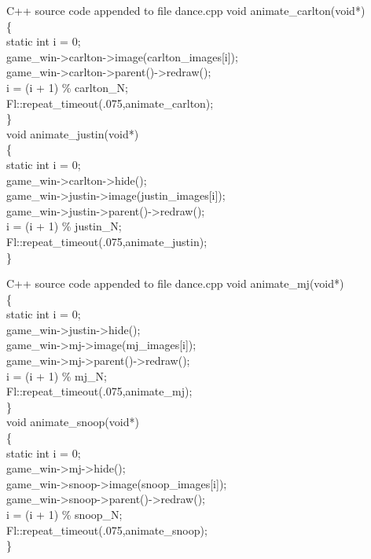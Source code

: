 \documentclass {article}
\begin{document}
\begin{GFT}{C++ source code appended to file dance.cpp}
\+void animate\_carlton(void*)\\
\+\{\\
\+     static int i = 0;\\
\+     game\_win->carlton->image(carlton\_images[i]);\\
\+     game\_win->carlton->parent()->redraw();\\
\+     i = (i + 1) \% carlton\_N;\\
\+     Fl::repeat\_timeout(.075,animate\_carlton);\\
\+\}\\
\+void animate\_justin(void*)\\
\+\{\\
\+     static int i = 0;\\
\+     game\_win->carlton->hide();\\
\+     game\_win->justin->image(justin\_images[i]);\\
\+     game\_win->justin->parent()->redraw();\\
\+     i = (i + 1) \% justin\_N;\\
\+     Fl::repeat\_timeout(.075,animate\_justin);\\
\+\}\\
\end{GFT}
\clearpage
\begin{GFT}{C++ source code appended to file dance.cpp}
\+void animate\_mj(void*)\\
\+\{\\
\+     static int i = 0;\\
\+     game\_win->justin->hide();\\
\+     game\_win->mj->image(mj\_images[i]);\\
\+     game\_win->mj->parent()->redraw();\\
\+     i = (i + 1) \% mj\_N;\\
\+     Fl::repeat\_timeout(.075,animate\_mj);\\
\+\}\\
\+void animate\_snoop(void*)\\
\+\{\\
\+     static int i = 0;\\
\+     game\_win->mj->hide();\\
\+     game\_win->snoop->image(snoop\_images[i]);\\
\+     game\_win->snoop->parent()->redraw();\\
\+     i = (i + 1) \% snoop\_N;\\
\+     Fl::repeat\_timeout(.075,animate\_snoop);\\
\+\}\\
\end{GFT}
\end{document}
